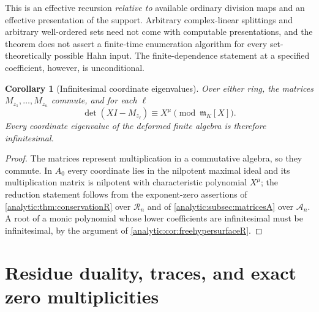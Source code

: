 \documentclass[11pt,letterpaper]{article}
\newtheorem{corollary}[theorem]{Corollary}
\theoremstyle{definition}
\theoremstyle{remark}
\newcommand{\A}{\mathscr A}
\newcommand{\RR}{\mathscr R}
\newcommand{\m}{\mathfrak m}
\numberwithin{equation}{section}
\begin{document}
This is an effective recursion \emph{relative to} available ordinary
division maps and an effective presentation of the support. Arbitrary
complex-linear splittings and arbitrary well-ordered sets need not come with
computable presentations, and the theorem does not assert a finite-time
enumeration algorithm for every set-theoretically possible Hahn input. The
finite-dependence statement at a specified coefficient, however, is
unconditional.

\begin{corollary}[Infinitesimal coordinate eigenvalues]
\label{analytic:cor:matrices}
Over either ring, the matrices $M_{z_1},\ldots,M_{z_n}$ commute, and for
each $\ell$
\begin{equation}\label{analytic:eq:characteristicreduction}
 \det(XI-M_{z_\ell})\equiv X^\mu \pmod{\m_K[X]} .
\end{equation}
Every coordinate eigenvalue of the deformed finite algebra is therefore
infinitesimal.
\end{corollary}
\begin{proof}
The matrices represent multiplication in a commutative algebra, so they
commute. In $A_0$ every coordinate lies in the nilpotent maximal ideal and
its multiplication matrix is nilpotent with characteristic polynomial
$X^\mu$; the reduction statement follows from the exponent-zero assertions
of \cref{analytic:thm:conservationR} over $\RR_n$ and of
\cref{analytic:subsec:matricesA} over $\A_n$. A root of a monic polynomial
whose lower coefficients are infinitesimal must be infinitesimal, by the
argument of \cref{analytic:cor:freehypersurfaceR}.
\end{proof}

\section{Residue duality, traces, and exact zero multiplicities}
\label{analytic:sec:trace}
\end{document}
